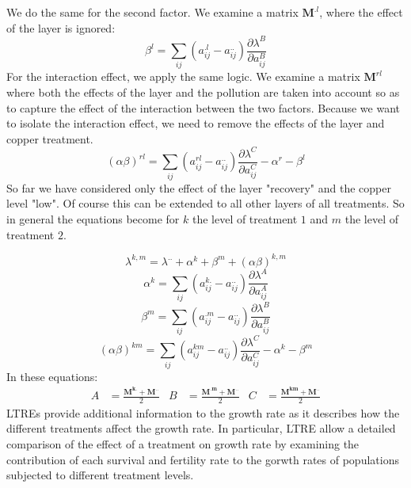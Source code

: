 \documentclass{article}\usepackage[]{graphicx}\usepackage[]{color}
\begin{document}
\begin{mdframed}
We do the same for the second factor. We examine a matrix $\boldsymbol{M}^{.l}$, where the effect of the layer is ignored: 
\begin{equation}\label{d}
\beta^{l}=\sum_{ij}(a^{.l}_{ij}-a^{..}_{ij}) \frac{\partial\lambda^{B}}{\partial a^{B}_{ij}}
\end{equation}
For the interaction effect, we apply the same logic. We examine a matrix $\boldsymbol{M}^{rl}$ where both the effects of the layer and the pollution are taken into account so as to capture the effect of the interaction between the two factors. Because we want to isolate the interaction effect, we need to remove the effects of the layer and copper treatment.
\begin{equation}
(\alpha \beta)^{rl}=\sum_{ij}(a^{rl}_{ij}-a^{..}_{ij}) \frac{\partial\lambda^{C}}{\partial a^{C}_{ij}} -\alpha^{r}-\beta^{l}
\end{equation}
So far we have considered only the effect of the layer "recovery" and the copper level "low". Of course this can be extended to all other layers of all treatments. So in general the equations become for $k$ the level of treatment $1$ and $m$ the level of treatment $2$.

\begin{equation}\label{f}
\lambda^{k,m}=\lambda^{..}+\alpha^{k}+\beta^{m}+(\alpha \beta)^{k,m}
\end{equation}
\begin{equation}\label{e}
\alpha^{k}=\sum_{ij}(a^{k.}_{ij}-a^{..}_{ij}) \frac{\partial\lambda^{A}}{\partial a^{A}_{ij}}
\end{equation}
\begin{equation}
\beta^{m}=\sum_{ij}(a^{.m}_{ij}-a^{..}_{ij}) \frac{\partial\lambda^{B}}{\partial a^{B}_{ij}}
\end{equation}
\begin{equation}
(\alpha \beta)^{km}=\sum_{ij}(a^{km}_{ij}-a^{..}_{ij}) \frac{\partial\lambda^{C}}{\partial a^{C}_{ij}} -\alpha^{k}-\beta^{m}
\end{equation}
In these equations:
\begin{align}
A &= \frac{\boldsymbol{M^{k.}} + \boldsymbol{M^{..}}}{2} & B &= \frac{\boldsymbol{M^{.m}} + \boldsymbol{M^{..}}}{2} & C &= \frac{\boldsymbol{M^{km}} + \boldsymbol{M^{..}}}{2}
\end{align}
LTREs provide additional information to the growth rate as it describes how the different treatments affect the growth rate. In particular, LTRE allow a detailed comparison of the effect of a treatment on growth rate by examining the contribution of each survival and fertility rate to the gorwth rates of populations subjected to different treatment levels.
\end{mdframed}
\end{document}
